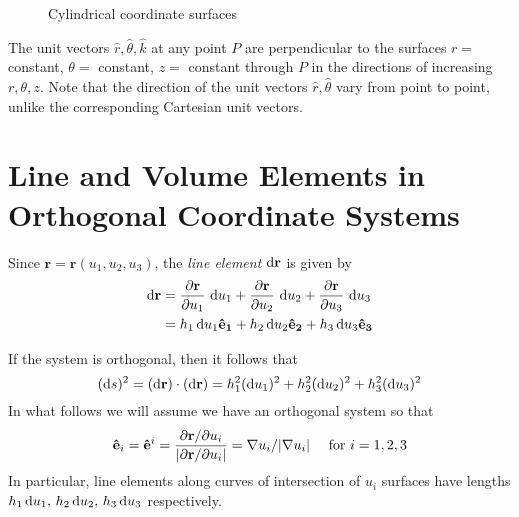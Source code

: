 \begin{exa}
\begin{figure}[h]
{}
 \caption[]{\quad Cylindrical coordinate surfaces}
 \label{fig:cylcoordsurf}
\end{figure}

The unit vectors $\hat r, \hat \theta,\hat k$ at any point $P$ are perpendicular to the surfaces $r =$ constant, $\theta =$ constant, $z =$ constant
 through $P$ in the directions of increasing $r, \theta, z$. Note that the direction of the unit vectors $\hat r,\hat \theta$ vary from point to point, unlike the corresponding Cartesian unit vectors.

\end{exa}



\section{Line and Volume Elements in Orthogonal Coordinate Systems}



\begin{definition}
Since $\mathbf r = \mathbf r(u_1,u_2,u_3)$,
the \emph{line element}
$\d \mathbf r$ is given by
\begin{align*}
  \d\mathbf r 
  &= \dfrac{\partial \mathbf r}{\partial u_1} \,\d u_1 
  + \dfrac{\partial \mathbf r}{\partial u_2} \,\d u_2 
  + \dfrac{\partial \mathbf r}{\partial u_3} \,\d u_3\\
  &= h_1\d u_1\versor {e_1}
  +  h_2\d u_2\versor {e_2}
  + h_3\d u_3\versor{e_3}
\end{align*}
\end{definition}

If the system is orthogonal, then it follows that
\[
  (\d s)^2 = (\d \mathbf r)\cdot  (\d \mathbf r) = h_1^2(\d u_1)^2 + 
  h_2^2(\d u_2)^2 +h_3^2(\d u_3)^2 
\]
In what follows we will assume we have an orthogonal system so that
\[
  \mathbf{\hat e}_i = \mathbf{\hat e}^i = \dfrac{\partial \mathbf r/\partial u_i}{|\partial \mathbf r/\partial u_i|}  = \nabla u_i / |\nabla u_i| \quad \mbox{ for $i=1,2,3$}
\]
In particular, line elements along curves of intersection of $u_i$ surfaces have lengths $h_1\d u_1,\, h_2\d u_2,\, h_3\d u_3$ respectively.\\


